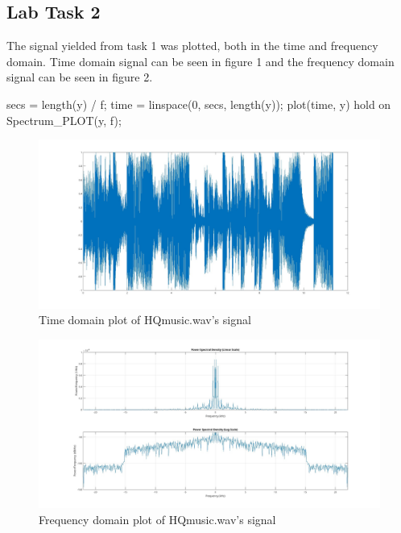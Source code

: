 \documentclass[a4paper,11pt]{article}
\begin{document}
\subsection{Lab Task 2}
The signal yielded from task 1 was plotted, both in the time and frequency domain. Time domain signal can be seen in figure 1 and the frequency domain signal can be seen in figure 2.

\begin{ffcode} 
secs = length(y) / f;
time = linspace(0, secs, length(y));
plot(time, y)
hold on
Spectrum_PLOT(y, f);
\end{ffcode}

\begin{figure}[H]
    \centering
    \hspace{-40pt}\includegraphics[scale = 0.2]{./images/Task2-PSD.jpg}
    \caption{Time domain plot of HQmusic.wav's signal}
    \label{fig:Task 2 Time domain}
\end{figure}

\begin{figure}[H]
    \centering
    \hspace{-60pt}\includegraphics[scale = 0.28]{./images/Task2-FFT.jpg}
    \caption{Frequency domain plot of HQmusic.wav's signal}
    \label{fig:Task 2 Freq. domain}
\end{figure}
\end{document}
